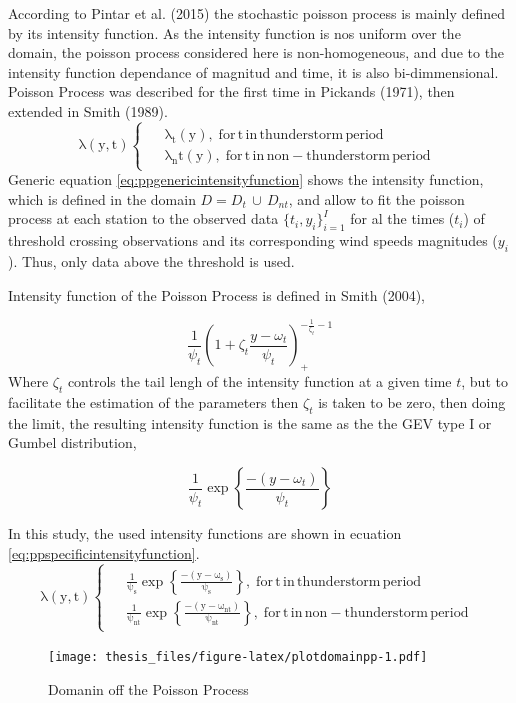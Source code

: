 \documentclass[12pt,twoside]{reedthesis}
\begin{document}
According to Pintar et al. (2015) the stochastic poisson process is mainly defined by its intensity function. As the intensity function is nos uniform over the domain, the poisson process considered here is non-homogeneous, and due to the intensity function dependance of magnitud and time, it is also bi-dimmensional. Poisson Process was described for the first time in Pickands (1971), then extended in Smith (1989).
\begin{equation}
  \mathrm{
    \lambda\left(y,t\right)
    \begin{cases}
      \begin{split}
            &\lambda_t(y),\;for\,t\,in\,thunderstorm\,period
            \\
            &\lambda_nt(y),\;for\,t\,in\,non-thunderstorm\,period      
      \end{split}
    \end{cases}
  }
  \label{eq:ppgenericintensityfunction}
\end{equation}
Generic equation \eqref{eq:ppgenericintensityfunction} shows the intensity function, which is defined in the domain \(D = D_t\,{\cup}\,D_{nt}\), and allow to fit the poisson process at each station to the observed data \(\{t_i, y_i\}_{i=1}^I\) for al the times (\(t_i\)) of threshold crossing observations and its corresponding wind speeds magnitudes (\(y_i\)). Thus, only data above the threshold is used.

Intensity function of the Poisson Process is defined in Smith (2004),

\[
\frac{1}{\psi_t}\left(1+\zeta_t\frac{y-\omega_t}{\psi_t}\right)_+^{-\frac{1}{\zeta_t}-1}
\]
Where \(\zeta_t\) controls the tail lengh of the intensity function at a given time \(t\), but to facilitate the estimation of the parameters then \(\zeta_t\) is taken to be zero, then doing the limit, the resulting intensity function is the same as the the GEV type I or Gumbel distribution,

\[
\frac{1}{\psi_t}\exp\left\{\frac{-(y-\omega_t)}{\psi_t}\right\}
\]

In this study, the used intensity functions are shown in ecuation \eqref{eq:ppspecificintensityfunction}.
\begin{equation}
  \mathrm{
    \lambda\left(y,t\right)
    \begin{cases}
      \begin{split}
            &\frac{1}{\psi_s}\exp\left\{\frac{-(y-\omega_s)}{\psi_s}\right\},\;for\,t\,in\,thunderstorm\,period
            \\
            &\frac{1}{\psi_{nt}}\exp\left\{\frac{-(y-\omega_{nt})}{\psi_{nt}}\right\},\;for\,t\,in\,non-thunderstorm\,period      
      \end{split}
    \end{cases}
  }
  \label{eq:ppspecificintensityfunction}
\end{equation}
\footnotesize
\begin{figure}
\centering
\texttt{[image: thesis\_files/figure-latex/plotdomainpp-1.pdf]}
\caption{\label{fig:plotdomainpp}Domanin off the Poisson Process}
\end{figure}
\normalsize
\end{document}
